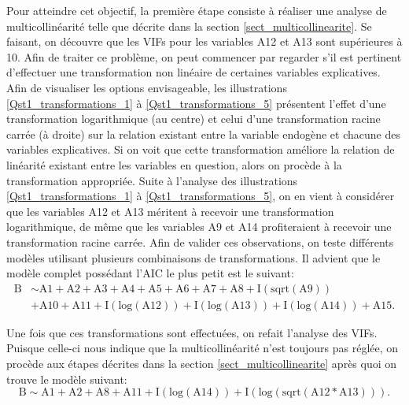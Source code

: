 \documentclass{article}
\begin{document}
	Pour atteindre cet objectif, la première étape consiste à réaliser une analyse de multicollinéarité telle que décrite dans la section \ref{sect_multicollinearite}. Se faisant, on découvre que les VIFs pour les variables A12 et A13 sont supérieures à 10. Afin de traiter ce problème, on peut commencer par regarder s'il est pertinent d'effectuer une transformation non linéaire de certaines variables explicatives. Afin de visualiser les options envisageable, les illustrations \ref{Qst1_transformations_1} à \ref{Qst1_transformations_5} présentent l'effet d'une transformation logarithmique (au centre) et celui d'une transformation racine carrée (à droite) sur la relation existant entre la variable endogène et chacune des variables explicatives. Si on voit que cette transformation améliore la relation de linéarité existant entre les variables en question, alors on procède à la transformation appropriée. Suite à l'analyse des illustrations \ref{Qst1_transformations_1} à \ref{Qst1_transformations_5}, on en vient à considérer que les variables A12 et A13 méritent à recevoir une transformation logarithmique, de même que les variables A9 et A14 profiteraient à recevoir une transformation racine carrée. Afin de valider ces observations, on teste différents modèles utilisant plusieurs combinaisons de transformations. Il advient que le modèle complet possédant l'AIC le plus petit est le suivant:
	\begin{align}\label{modele_complet}
		\mathrm{B} &\sim \mathrm{A1 + A2 + A3 + A4 + A5 + A6 + A7 + A8 + I(sqrt(A9))}\\
			&\mathrm{+ A10 + A11 + I(log(A12)) + I(log(A13)) + I(log(A14)) + A15}.\nonumber
	\end{align}
	
	Une fois que ces transformations sont effectuées, on refait l'analyse des VIFs. Puisque celle-ci nous indique que la multicollinéarité n'est toujours pas réglée, on procède aux étapes décrites dans la section \ref{sect_multicollinearite} après quoi on trouve le modèle suivant:
	\begin{equation}\label{modele_traitement_multicol_methode_iterative}
		\mathrm{B} \sim \mathrm{A1 + A2 + A8 + A11 + I(log(A14)) + I(log(sqrt(A12 * A13)))}.
	\end{equation}
	
\end{document}
